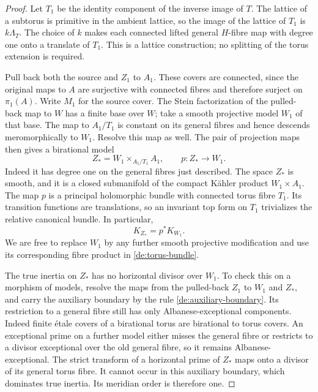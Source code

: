 \begin{proof}
Let \(T_1\) be the identity component of the inverse image of
\(T\). The lattice of a subtorus is primitive in the ambient
lattice, so the image of the lattice of \(T_1\) is
\(k\Lambda_T\). The choice of \(k\) makes each connected lifted
general \(H\)-fibre map with degree one onto a translate of
\(T_1\). This is a lattice construction; no splitting of the torus
extension is required.

Pull back both the source and \(Z_1\) to \(A_1\). These covers
are connected, since the original maps to \(A\) are surjective
with connected fibres and therefore surject on \(\pi_1(A)\).
Write \(M_1\) for the source cover. The Stein factorization of
the pulled-back map to \(W\) has a finite base over \(W\); take
a smooth projective model \(W_1\) of that base. The map to
\(A_1/T_1\) is constant on its general fibres and hence descends
meromorphically to \(W_1\). Resolve this map as well. The pair of
projection maps then gives a birational model
\begin{equation}\label{de:torus-bundle}
 Z_*=W_1\times_{A_1/T_1}A_1,
 \qquad p:Z_*\longrightarrow W_1.
\end{equation}
Indeed it has degree one on the general fibres just described.
The space \(Z_*\) is smooth, and it is a closed submanifold of the
compact K\"ahler product \(W_1\times A_1\). The map \(p\) is
a principal holomorphic bundle with connected torus fibre \(T_1\).
Its transition functions are translations, so an invariant top form
on \(T_1\) trivializes the relative canonical bundle. In particular,
\begin{equation}\label{de:canonical-pullback}
 K_{Z_*}=p^*K_{W_1}.
\end{equation}
We are free to replace \(W_1\) by any further smooth projective modification
and use its corresponding fibre product in
\eqref{de:torus-bundle}.

The true inertia on \(Z_*\) has no horizontal divisor over
\(W_1\). To check this on a morphism of models, resolve the maps
from the pulled-back \(Z_1\) to \(W_1\) and \(Z_*\), and
carry the auxiliary boundary by the rule
\eqref{de:auxiliary-boundary}. Its restriction to a general fibre
still has only Albanese-exceptional components. Indeed finite
\'etale covers of a birational torus are birational to torus
covers. An exceptional prime on a further model either misses the
general fibre or restricts to a divisor exceptional over the old
general fibre, so it remains Albanese-exceptional. The strict transform
of a horizontal prime of
\(Z_*\) maps onto a divisor of its general torus fibre. It cannot
occur in this auxiliary boundary, which dominates true inertia.
Its meridian order is therefore one.


\end{proof}
